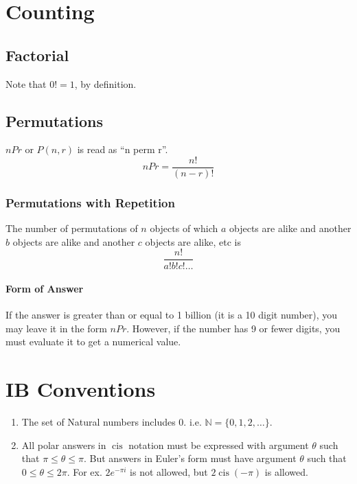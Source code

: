 \documentclass{report}
\DeclareMathOperator\cis{cis}
\theoremstyle{definition}
\numberwithin{equation}{section}
\begin{document}
\section{Counting}
\subsection{Factorial}
Note that $0 ! = 1$, by definition.

\subsection{Permutations}
$nPr$ or $P(n,r)$ is read as ``n perm r''.
\begin{equation}
	nPr = \frac{n!}{(n-r)!}
\end{equation}

\subsubsection{Permutations with Repetition}
The number of permutations of $n$ objects of which $a$ objects are alike and another $b$ objects are alike and another $c$ objects are alike, etc is
\begin{equation*}
	\frac{n!}{a!b!c!\dots}
\end{equation*}


\paragraph{Form of Answer}
If the answer is greater than or equal to 1 billion (it is a 10 digit number), you may leave it in the form $nPr$. However, if the number has 9 or fewer digits, you must evaluate it to get a numerical value.

\section{IB Conventions}
\begin{enumerate}
	\item The set of Natural numbers includes 0. i.e. $\mathbb{N} = \{0,1,2,\dots\}$.
	\item All polar answers in $\cis$ notation must be expressed with argument $\theta$ such that $\pi\le\theta\le\pi$. But answers in Euler's form must have argument $\theta$ such that $0 \le \theta \le 2 \pi$. For ex. $2e^{-\pi i}$ is not allowed, but $2\cis(-\pi)$ is allowed.
\end{enumerate}
\end{document}
